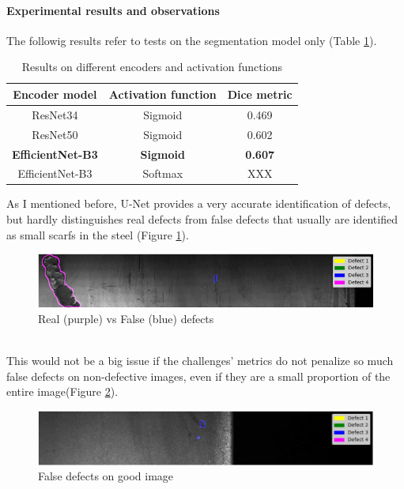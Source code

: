 \documentclass[10pt,twocolumn,letterpaper]{article}
\begin{document}
      \paragraph{Experimental results and observations}
         The followig results refer to tests on the segmentation model only (Table \ref{table:res_encoders}).
         \begin{table}[h]
            \centering
            \begin{tabular}{||c c c||} 
            \hline
            Encoder model & Activation function & Dice metric\\ [0.4ex] 
            \hline\hline
            ResNet34 & Sigmoid & 0.469 \\ 
            \hline
            ResNet50 & Sigmoid & 0.602 \\
            \hline
            \textbf{EfficientNet-B3} & \textbf{Sigmoid} & \textbf{0.607} \\
            \hline
            EfficientNet-B3 & Softmax & XXX \\
            \hline
            \end{tabular}
            \caption{Results on different encoders and activation functions}
            \label{table:res_encoders}
         \end{table}

         As I mentioned before, U-Net provides a very accurate identification of defects, but hardly distinguishes real defects from false defects that usually are identified as small scarfs in the steel (Figure \ref{fig:result1}). 
         \begin{figure}[h]
            \centering
            \caption{Real (purple) vs False (blue) defects} \label{fig:result1}
            \includegraphics[scale=0.5]{Img_Result1.png}
         \end{figure}
         \\This would not be a big issue if the challenges' metrics do not penalize so much false defects on non-defective images, even if they are a small proportion of the entire image(Figure \ref{fig:result2}).  
         \begin{figure}[h]
            \centering
            \caption{False defects on good image} \label{fig:result2}
            \includegraphics[scale=0.355]{Img_Result2.png}
         \end{figure}
   
\end{document}
